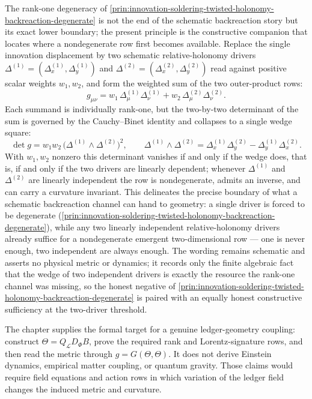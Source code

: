 \begin{principle}
\label{prin:innovation-soldering-two-driver-nondegenerate}
The rank-one degeneracy of
\autoref{prin:innovation-soldering-twisted-holonomy-backreaction-degenerate}
is not the end of the schematic backreaction story but its exact lower
boundary; the present principle is the constructive companion that
locates where a nondegenerate row first becomes available. Replace the
single innovation displacement by two schematic relative-holonomy
drivers $\Delta^{(1)}=(\Delta^{(1)}_x,\Delta^{(1)}_y)$ and
$\Delta^{(2)}=(\Delta^{(2)}_x,\Delta^{(2)}_y)$ read against positive
scalar weights $w_1,w_2$, and form the weighted sum of the two
outer-product rows:
$$
g_{\mu\nu}
=
w_1\,\Delta^{(1)}_\mu\Delta^{(1)}_\nu
+
w_2\,\Delta^{(2)}_\mu\Delta^{(2)}_\nu.
$$
Each summand is individually rank-one, but the two-by-two determinant of
the sum is governed by the Cauchy--Binet identity and collapses to a
single wedge square:
$$
\det g
=
w_1 w_2\,\bigl(\Delta^{(1)}\wedge\Delta^{(2)}\bigr)^2,
\qquad
\Delta^{(1)}\wedge\Delta^{(2)}
=
\Delta^{(1)}_x\Delta^{(2)}_y-\Delta^{(1)}_y\Delta^{(2)}_x.
$$
With $w_1,w_2$ nonzero this determinant vanishes if and only if the wedge
does, that is, if and only if the two drivers are linearly dependent;
whenever $\Delta^{(1)}$ and $\Delta^{(2)}$ are linearly independent the
row is nondegenerate, admits an inverse, and can carry a curvature
invariant. This delineates the precise boundary of what a schematic
backreaction channel can hand to geometry: a single driver is forced to
be degenerate
(\autoref{prin:innovation-soldering-twisted-holonomy-backreaction-degenerate}),
while any two linearly independent relative-holonomy drivers already
suffice for a nondegenerate emergent two-dimensional row --- one is never
enough, two independent are always enough. The wording remains schematic
and asserts no physical metric or dynamics; it records only the finite
algebraic fact that the wedge of two independent drivers is exactly the
resource the rank-one channel was missing, so the honest negative of
\autoref{prin:innovation-soldering-twisted-holonomy-backreaction-degenerate}
is paired with an equally honest constructive sufficiency at the
two-driver threshold.
\end{principle}

\begin{principle}
\label{prin:innovation-soldering-proof-boundary}
The chapter supplies the formal target for a genuine ledger-geometry
coupling: construct $\Theta=Q_{\mathcal L}D_{\Phi}B$, prove the required
rank and Lorentz-signature rows, and then read the metric through
$g=G(\Theta,\Theta)$. It does not derive Einstein dynamics, empirical
matter coupling, or quantum gravity. Those claims would require field
equations and action rows in which variation of the ledger field changes
the induced metric and curvature.
\end{principle}

